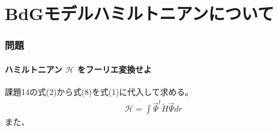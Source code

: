 \documentclass{jsarticle}
\begin{document}
\part{BdGモデルハミルトニアンについて}
	\section{問題}
		\subsection{ハミルトニアン $\mathcal{H}$ をフーリエ変換せよ}
		課題14の式(2)から式(8)を式(1)に代入して求める。
    \begin{align}
      \mathcal{H}=\int \vec{\Psi}^\dagger \tilde{H}\vec{\Psi}dr
    \end{align}
    また、
\end{document}
